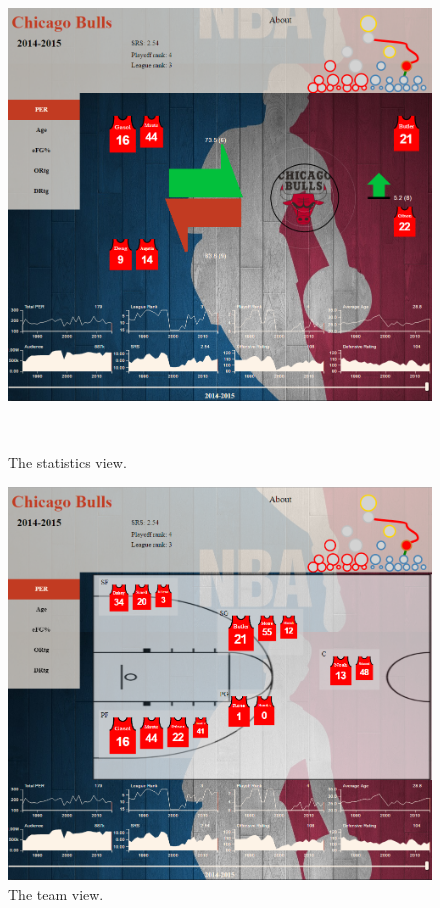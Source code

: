 \documentclass[chi_draft]{sigchi}
\begin{document}
\begin{figure}
\centering
  \includegraphics[width=1.0\columnwidth]{figures/statisticsview}
  \caption{The statistics view.}~\label{fig:statisticsview}
\end{figure}

\begin{figure}
\centering
  \includegraphics[width=1.0\columnwidth]{figures/teamview}
  \caption{The team view.}
  \label{fig:teamview}
\end{figure}
\end{document}
